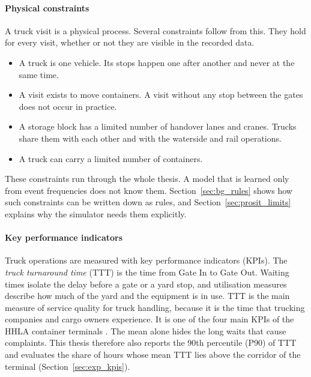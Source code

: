 \paragraph{Physical constraints}
A truck visit is a physical process. Several constraints follow from this. They
hold for every visit, whether or not they are visible in the recorded data.
\begin{itemize}[itemsep=2pt,topsep=4pt]
\item A truck is one vehicle. Its stops happen one after another and never at
the same time.
\item A visit exists to move containers. A visit without any stop between the
gates does not occur in practice.
\item A storage block has a limited number of handover lanes and cranes. Trucks
share them with each other and with the waterside and rail operations.
\item A truck can carry a limited number of containers.
\end{itemize}
These constraints run through the whole thesis. A model that is learned only
from event frequencies does not know them. Section~\ref{sec:bg_rules} shows how
such constraints can be written down as rules, and Section~\ref{sec:prosit_limits}
explains why the simulator needs them explicitly.

\paragraph{Key performance indicators}
Truck operations are measured with key performance indicators (KPIs). The
\emph{truck turnaround time} (TTT) is the time from Gate In to Gate Out. Waiting
times isolate the delay before a gate or a yard stop, and utilisation measures
describe how much of the yard and the equipment is in use. TTT is the main
measure of service quality for truck handling, because it is the time that
trucking companies and cargo owners experience. It is one of the four main
KPIs of the HHLA container terminals \cite{Bett2024,CTprocessMiningTAS2020}.
The mean alone hides the long waits that cause complaints. This thesis
therefore also reports the 90th percentile (P90) of TTT and evaluates the share of
hours whose mean TTT lies above the corridor of the terminal
(Section~\ref{sec:exp_kpis}).

